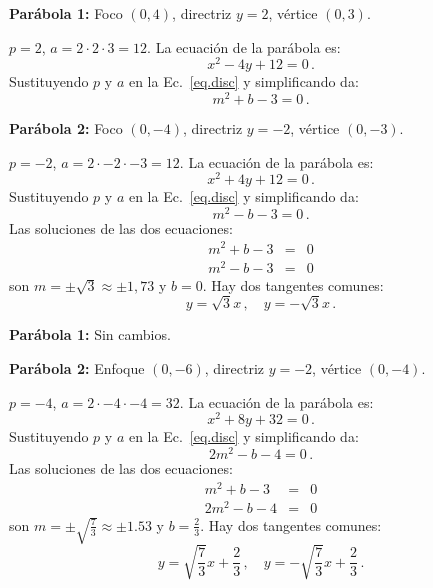 \begin{example}\mbox{}

\noindent\textbf{Parábola 1:} Foco $(0,4)$, directriz $y=2$, vértice $(0,3)$.

\noindent{}$p=2$, $a=2\cdot 2\cdot 3=12$. La ecuación de la parábola es:
\[
x^2-4y +12=0\,.
\]
Sustituyendo $p$ y $a$ en la Ec.~\ref{eq.disc} y simplificando da:
\[
m^2+b-3=0\,.
\]

\noindent\textbf{Parábola 2:} Foco $(0,-4)$, directriz $y=-2$, vértice $(0,-3)$.

\noindent{}$p=-2$, $a=2\cdot -2\cdot -3=12$. La ecuación de la parábola es:
\[
x^2+4y+12=0\,.
\]
Sustituyendo $p$ y $a$ en la Ec.~\ref{eq.disc} y simplificando da:
\[
m^2-b-3=0\,.
\]
Las soluciones de las dos ecuaciones:
\begin{eqnarray*}
m^2+b-3&=&0\\
m^2-b-3&=&0
\end{eqnarray*}
son $m=\pm\sqrt{3}\approx \pm 1,73$ y $b=0$. Hay dos tangentes comunes:
\[
y=\sqrt{3}x\,,\quad y=-\sqrt{3}x\,.
\]
\end{example}

\begin{example}\mbox{}

\noindent\textbf{Parábola 1:}
Sin cambios.

\noindent\textbf{Parábola 2:} Enfoque $(0,-6)$, directriz $y=-2$, vértice $(0,-4)$.

\noindent{}$p=-4$, $a=2\cdot -4\cdot -4=32$. La ecuación de la parábola es:
\[
x^2+8y +32=0\,.
\]
Sustituyendo $p$ y $a$ en la Ec.~\ref{eq.disc} y simplificando da:
\[
2m^2-b-4=0\,.
\]
Las soluciones de las dos ecuaciones:
\begin{eqnarray*}
m^2+b-3&=&0\\
2m^2-b-4&=&0
\end{eqnarray*}
son $m=\pm\sqrt{\displaystyle\frac{7}{3}}\approx \pm 1.53$ y $b=\displaystyle\frac{2}{3}$. Hay dos tangentes comunes:
\[
y=\sqrt{\frac{7}{3}}x+\frac{2}{3}\,,\quad y=-\sqrt{\frac{7}{3}}x+\frac{2}{3}\,.
\]
\end{example}


